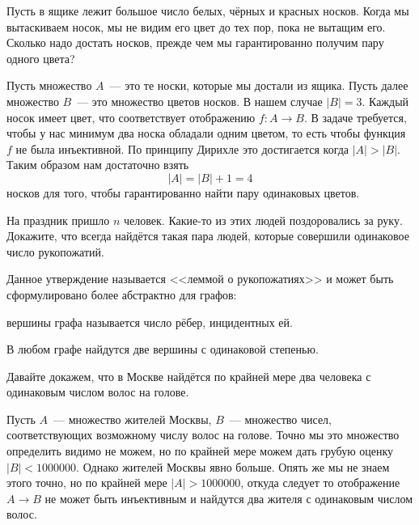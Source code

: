 \begin{example}
Пусть в ящике лежит большое число белых, чёрных и красных носков. Когда мы вытаскиваем носок, мы не видим его цвет до тех пор, пока не вытащим его. Сколько надо достать носков, прежде чем мы гарантированно получим пару одного цвета?
\end{example}

Пусть множество $A$~--- это те носки, которые мы достали из ящика. Пусть далее множество $B$~--- это множество цветов носков. В нашем случае $|B|=3$. Каждый носок имеет цвет, что соответствует отображению $f:A\to B$. В задаче требуется, чтобы у нас минимум два носка обладали одним цветом, то есть чтобы функция $f$ не была инъективной. По принципу Дирихле это достигается когда $|A|>|B|$. Таким образом нам достаточно взять $$|A|=|B|+1 = 4$$ носков для того, чтобы гарантированно найти пару одинаковых цветов.

\begin{exercise}
На праздник пришло $n$ человек. Какие-то из этих людей поздоровались за руку. Докажите, что всегда найдётся такая пара людей, которые совершили одинаковое число рукопожатий.
\end{exercise}

Данное утверждение называется <<леммой о рукопожатиях>> и может быть сформулировано более абстрактно для графов:

\begin{definition}
 вершины графа называется число рёбер, инцидентных ей.
\end{definition}

\begin{HandshakesLemma}
В любом графе найдутся две вершины с одинаковой степенью.
\end{HandshakesLemma}

\begin{example}
Давайте докажем, что в Москве найдётся по крайней мере два человека с одинаковым числом волос на голове.

Пусть $A$~--- множество жителей Москвы, $B$~--- множество чисел, соответствующих возможному числу волос на голове. Точно мы это множество определить видимо не можем, но по крайней мере можем дать грубую оценку $|B|<1000000$. Однако жителей Москвы явно больше. Опять же мы не знаем этого точно, но по крайней мере $|A|>1000000$, откуда следует то отображение $A\to B$ не может быть инъективным и найдутся два жителя с одинаковым числом волос.
\end{example}

